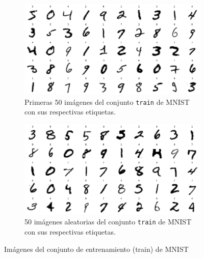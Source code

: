 \begin{figure}[h!]
    \centering
    \begin{subfigure}[b]{0.47\textwidth}
        \centering
        \includegraphics[width=\textwidth]{images/mnist/mnist_train_first50.png}
        \caption{Primeras 50 imágenes del conjunto \texttt{train} de MNIST con sus respectivas etiquetas.}
        \label{mnist1}
    \end{subfigure}
    \hspace{1em}
    \begin{subfigure}[b]{0.47\textwidth}
        \centering
        \includegraphics[width=\textwidth]{images/mnist/mnist_train_random.png}
        \caption{50 imágenes aleatorias del conjunto \texttt{train} de MNIST con sus respectivas etiquetas.}
        \label{mnist2}
    \end{subfigure}
    \caption{Imágenes del conjunto de entrenamiento (train) de MNIST}
    \label{mnist_train}
\end{figure}

